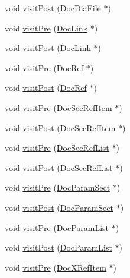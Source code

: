 \begin{DoxyCompactItemize}
\item 
void \hyperlink{class_docbook_doc_visitor_a0481642ca47ae8824544bdb264927d88}{visit\+Post} (\hyperlink{class_doc_dia_file}{Doc\+Dia\+File} $\ast$)
\item 
void \hyperlink{class_docbook_doc_visitor_ae9ddf45aa0fd1bf22c392edf4b7119b8}{visit\+Pre} (\hyperlink{class_doc_link}{Doc\+Link} $\ast$)
\item 
void \hyperlink{class_docbook_doc_visitor_aeb9db5474ef1f50186f004b49db3c387}{visit\+Post} (\hyperlink{class_doc_link}{Doc\+Link} $\ast$)
\item 
void \hyperlink{class_docbook_doc_visitor_a7089c4570d826f5ea11003d7a90d7d1b}{visit\+Pre} (\hyperlink{class_doc_ref}{Doc\+Ref} $\ast$)
\item 
void \hyperlink{class_docbook_doc_visitor_a06d50e3cd208a020f66fc589ddfd45ed}{visit\+Post} (\hyperlink{class_doc_ref}{Doc\+Ref} $\ast$)
\item 
void \hyperlink{class_docbook_doc_visitor_a228463940e13aba47acd32f25838d121}{visit\+Pre} (\hyperlink{class_doc_sec_ref_item}{Doc\+Sec\+Ref\+Item} $\ast$)
\item 
void \hyperlink{class_docbook_doc_visitor_a08eb7b9592cb81e7920f4ae6a1369408}{visit\+Post} (\hyperlink{class_doc_sec_ref_item}{Doc\+Sec\+Ref\+Item} $\ast$)
\item 
void \hyperlink{class_docbook_doc_visitor_acd2ec9072fbf7abb46ab77b0cb29be48}{visit\+Pre} (\hyperlink{class_doc_sec_ref_list}{Doc\+Sec\+Ref\+List} $\ast$)
\item 
void \hyperlink{class_docbook_doc_visitor_ad49b546ea068863c54461eabf6adb5e8}{visit\+Post} (\hyperlink{class_doc_sec_ref_list}{Doc\+Sec\+Ref\+List} $\ast$)
\item 
void \hyperlink{class_docbook_doc_visitor_ae896d743a5c3df1f4c36c2038ea1878c}{visit\+Pre} (\hyperlink{class_doc_param_sect}{Doc\+Param\+Sect} $\ast$)
\item 
void \hyperlink{class_docbook_doc_visitor_ada803d6e8c554c1c1e05e3e8f96c1534}{visit\+Post} (\hyperlink{class_doc_param_sect}{Doc\+Param\+Sect} $\ast$)
\item 
void \hyperlink{class_docbook_doc_visitor_adaeab406ff1629259fce8ffb2195dcfe}{visit\+Pre} (\hyperlink{class_doc_param_list}{Doc\+Param\+List} $\ast$)
\item 
void \hyperlink{class_docbook_doc_visitor_a6747f583e3e6d3cf92b6f89058c3b0f9}{visit\+Post} (\hyperlink{class_doc_param_list}{Doc\+Param\+List} $\ast$)
\item 
void \hyperlink{class_docbook_doc_visitor_afdbd7c8b4835c52ebb83da1633c2bce3}{visit\+Pre} (\hyperlink{class_doc_x_ref_item}{Doc\+X\+Ref\+Item} $\ast$)

\end{DoxyCompactItemize}
